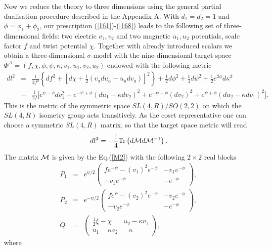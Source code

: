\documentclass[a4paper,12pt]{article}
\def\Tr{{\rm Tr}}
\begin{document}
Now we reduce the theory to three dimensions using the general
partial dualisation procedure described in the Appendix A. With
$d_1=d_2=1$ and $\phi=\phi_1+\phi_2$, our prescription
(\ref{161})-(\ref{168}) leads to the following set of
three-dimensional fields: two electric $v_1, v_2$ and two magnetic
$u_1, u_2$ potentials, scale factor $f$ and twist potential
$\chi$. Together with already introduced scalars we obtain a
three-dimensional $\sigma$-model with the nine-dimensional target
space $\Phi^A = (f, \chi, \phi, \psi, \kappa, v_1, u_1, v_2, u_2)$
endowed with the following metric
\begin{eqnarray}\label{TS4}
dl^2 &=& \frac1{2f^2} \left\{ df^2 + \left[ d\chi + \frac12
\left( v_a du_a - u_a dv_a \right) \right]^2 \right\} + \frac12
d\phi^2 + \frac14 d\psi^2 + \frac12 e^{2\phi} d\kappa^2
\nonumber \\
&-& \frac1{2f} \Big[ e^{\psi-\phi} dv_1^2 + e^{-\psi+\phi} (du_1
- \kappa dv_2)^2 + e^{-\psi-\phi} (dv_2)^2 + e^{\psi+\phi} (du_2
- \kappa dv_1)^2 \Big]. \label{TSM}
\end{eqnarray}
This is the metric of the symmetric space $SL(4,R)/SO(2,2)$ on
which the $SL(4,R)$ isometry group acts transitively. As the
coset representative one can choose a symmetric $SL(4,R)$ matrix,
so that the target space metric will read
\begin{equation}
dl^2 = -\frac14 \Tr \left( d {\cal M} d {\cal M}^{-1} \right).
\end{equation}
The matrix ${\cal M}$ is given by the Eq.(\ref{M2}) with the
following $2\times 2$ real blocks
\begin{eqnarray}
P_1 &=& e^{\psi/2} \left( \begin{array}{cc}
  f e^{-\psi} - (v_1)^2 e^{-\phi} & -v_1 e^{-\phi} \\
  -v_1 e^{-\phi} & -e^{-\phi}
  \end{array} \right), \\
P_2 &=& e^{-\psi/2} \left( \begin{array}{cc}
  f e^\psi - (v_2)^2 e^{-\phi} & -v_2 e^{-\phi} \\
  -v_2 e^{-\phi} & -e^{-\phi}
  \end{array} \right), \\
Q &=& \left( \begin{array}{cc}
  \frac12 \xi-\chi & u_2 - \kappa v_1 \\
  u_1 - \kappa v_2 & -\kappa
  \end{array} \right),
\end{eqnarray}
where
\end{document}
